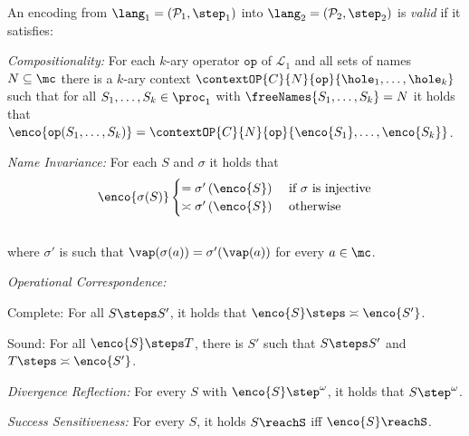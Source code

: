 \documentclass[final,copyright,creativecommons]{eptcs}
\begin{document}
\begin{definition}
	An encoding from $ \lang_1 = \left( \mathcal{P}_1, \step_1 \right) $ into $ \lang_2 = \left( \mathcal{P}_2, \step_2 \right) $ is \emph{valid} if it satisfies:
	\begin{compactenum}
		\item[\textit{Compositionality:}] For each $ k $-ary operator $ \mathtt{op} $ of $ \mathcal{L}_1 $ and all sets of names $ N \subseteq \mc $ there is a $k$-ary context $ \contextOP{C}{N}{\mathtt{op}}{\hole_1, \dots, \hole_k} $ such that for all $ S_1, \dots, S_k \in \proc_1 $ with $ \freeNames{S_1, \dots, S_k} = N $ it holds that $ \enco{\mathtt{op}(S_1, \dots, S_k)} = \contextOP{C}{N}{\mathtt{op}}{\enco{S_1}, \ldots, \enco{S_k}} $.
		\item[\textit{Name Invariance:}] For each $S$ and $\sigma$ it holds that
			\vspace*{-0.5em}
			\begin{align*}
				\enco{\sigma(S)}
				\begin{cases}
					= \sigma'\left( \enco{S} \right) & \text{ if } \sigma \text{ is injective}\\
					\asymp \sigma'\left( \enco{S} \right) & \text{ otherwise}
				\end{cases}
			\end{align*}
			\vspace*{-1em}\\
where $\sigma'$ is such that $ \vap(\sigma(a)) = \sigma'(\vap(a)) $ for every $a \in \mc $.
		\item[\textit{Operational Correspondence:}] $ $
			\begin{compactenum}
				\item[Complete:] For all $ S \steps S' $, it holds that $ \enco{S} \steps \asymp \enco{S'} $.
				\item[Sound:] For all $ \enco{S} \steps T $, there is $ S' $ such that $ S \steps S' $ and $ T \steps \asymp \enco{S'} $.
			\end{compactenum}
		\item[\textit{Divergence Reflection:}] For every $ S $ with $ \enco{S} \step^{\omega} $, it holds that $ S \step^{\omega} $.
		\item[\textit{Success Sensitiveness:}] For every $ S $, it holds $ S \reachS $ iff $ \enco{S} \reachS $.
	\end{compactenum}
\end{definition}
\end{document}
